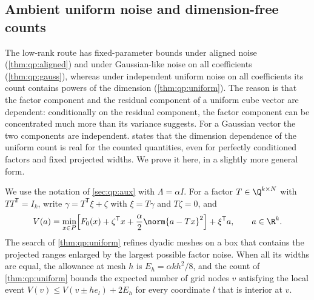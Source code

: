 \subsection{Ambient uniform noise and dimension-free counts}\label{sec:lim:ambient}

The low-rank route has fixed-parameter bounds under aligned noise
(\cref{thm:qp:aligned}) and under Gaussian-like noise on all coefficients
(\cref{thm:qp:gauss}), whereas under independent uniform noise on all
coefficients its count contains powers of the dimension
(\cref{thm:qp:uniform}). The reason is that the factor component and the
residual component of a uniform cube vector are dependent: conditionally on
the residual component, the factor component can be concentrated much more
than its variance suggests. For a Gaussian vector the two components are
independent.  states that the dimension
dependence of the uniform count is real for the counted quantities, even for
perfectly conditioned factors and fixed projected widths. We prove it here,
in a slightly more general form.

We use the notation of \cref{sec:qp:aux} with $\Lambda=\alpha I$. For a
factor $T\in\Q^{k\times N}$ with $TT^{\mathsf T}=I_k$, write
$\gamma=T^{\mathsf T}\xi+\zeta$ with $\xi=T\gamma$ and $T\zeta=0$, and
\begin{equation}\label{eq:lim:aux}
 V(a)=\min_{x\in P}\Bigl[F_0(x)+\zeta^{\mathsf T}x
 +\frac\alpha2\norm{a-Tx}^2\Bigr]+\xi^{\mathsf T}a,\qquad a\in\R^k .
\end{equation}
The search of \cref{thm:qp:uniform} refines dyadic meshes on a box that
contains the projected ranges enlarged by the largest possible factor
noise. When all its widths are equal, the allowance at mesh $h$ is
$E_h=\alpha kh^2/8$, and the count of \cref{thm:qp:uniform} bounds the
expected number of grid nodes $v$ satisfying the local event
$V(v)\le V(v\pm he_l)+2E_h$ for every coordinate $l$ that is interior at
$v$.

